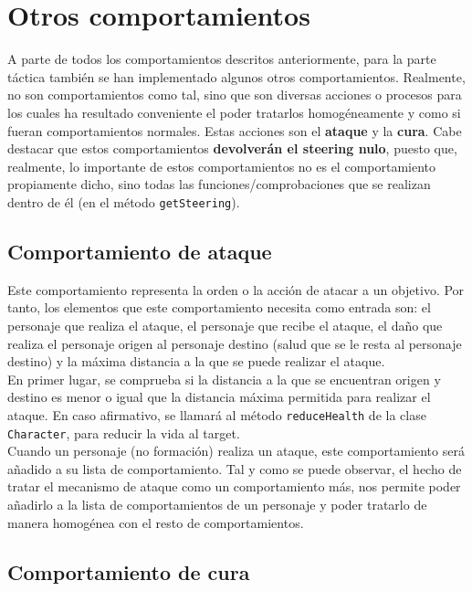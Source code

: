 \medskip
\section{Otros comportamientos}

A parte de todos los comportamientos descritos anteriormente, para la parte táctica también se han implementado algunos otros comportamientos. Realmente, no son comportamientos como tal, sino que son diversas acciones o procesos para los cuales ha resultado conveniente el poder tratarlos homogéneamente y como si fueran comportamientos normales. Estas acciones son el \textbf{ataque} y la \textbf{cura}. Cabe destacar que estos comportamientos \textbf{devolverán el steering nulo}, puesto que, realmente, lo importante de estos comportamientos no es el comportamiento propiamente dicho, sino todas las funciones/comprobaciones que se realizan dentro de él (en el método \texttt{getSteering}).

\subsection{Comportamiento de ataque}

Este comportamiento representa la orden o la acción de atacar a un objetivo. Por tanto, los elementos que este comportamiento necesita como entrada son: el personaje que realiza el ataque, el personaje que recibe el ataque, el daño que realiza el personaje origen al personaje destino (salud que se le resta al personaje destino) y la máxima distancia a la que se puede realizar el ataque. \\

En primer lugar, se comprueba si la distancia a la que se encuentran origen y destino es menor o igual que la distancia máxima permitida para realizar el ataque. En caso afirmativo, se llamará al método \texttt{reduceHealth} de la clase \texttt{Character}, para reducir la vida al target. \\

Cuando un personaje (no formación) realiza un ataque, este comportamiento será añadido a su lista de comportamiento. Tal y como se puede observar, el hecho de tratar el mecanismo de ataque como un comportamiento más, nos permite poder añadirlo a la lista de comportamientos de un personaje y poder tratarlo de manera homogénea con el resto de comportamientos.

\subsection{Comportamiento de cura}

